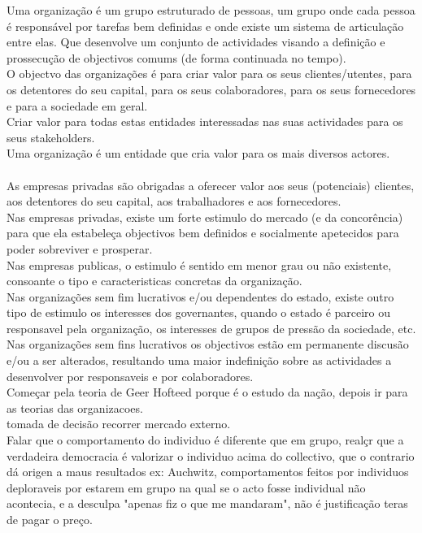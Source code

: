 Uma organização é um grupo estruturado de pessoas, um grupo onde cada pessoa é responsável por tarefas bem definidas e onde existe um sistema de articulação entre elas. Que desenvolve um conjunto de actividades visando a definição e prossecução de objectivos comums (de forma continuada no tempo).\\

O objectvo das organizações é para criar valor para os seus clientes/utentes, para os detentores do seu capital, para os seus colaboradores, para os seus fornecedores e para a sociedade em geral.\\
Criar valor para todas estas entidades interessadas nas suas actividades para os seus stakeholders.\\
Uma organização é um entidade que cria valor para os mais diversos actores.\\ \\

As empresas privadas são obrigadas a oferecer valor aos seus (potenciais) clientes, aos detentores do seu capital, aos trabalhadores e aos fornecedores.\\
Nas empresas privadas, existe um forte estimulo do mercado (e da concorência) para que ela estabeleça objectivos bem definidos e socialmente apetecidos para poder sobreviver e prosperar.\\

Nas empresas publicas, o estimulo é sentido em menor grau ou não existente, consoante o tipo e caracteristicas concretas da organização.\\

Nas organizações sem fim lucrativos e/ou dependentes do estado, existe outro tipo de estimulo os interesses dos governantes, quando o estado é parceiro ou responsavel pela organização, os interesses de grupos de pressão da sociedade, etc.\\

Nas organizações sem fins lucrativos os objectivos estão em permanente discusão e/ou a ser alterados, resultando uma maior indefinição sobre as actividades a desenvolver por responsaveis e por colaboradores.\\

Começar pela teoria de Geer Hofteed porque é o estudo da nação, depois ir para as teorias das organizacoes.\\
tomada de decisão recorrer mercado externo.\\

Falar que o comportamento do individuo é diferente que em grupo, realçr que a verdadeira democracia é valorizar o individuo acima do collectivo, que o contrario dá origen a maus resultados ex: Auchwitz, comportamentos feitos por individuos deploraveis por estarem em grupo na qual se o acto fosse individual não acontecia, e a desculpa "apenas fiz o que me mandaram", não é justificação teras de pagar o preço.\\


